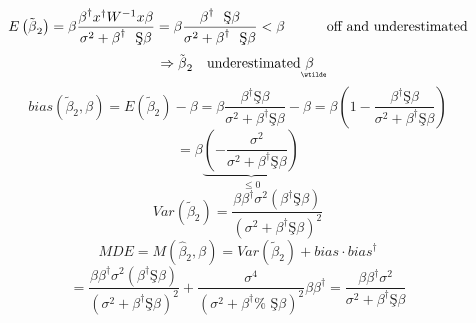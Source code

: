 \documentclass{article}
\begin{document}
\begin{equation*}
E\left( \tilde{\beta}_{2}\right) =\beta \frac{\beta ^{\dagger }x^{\dagger
}W^{-1}x\beta }{\sigma ^{2}+\beta ^{\dagger }\text{\c{S}}\beta }=\beta \frac{%
\beta ^{\dagger }\text{\c{S}}\beta }{\sigma ^{2}+\beta ^{\dagger }\text{\c{S}%
}\beta }<\beta \qquad \text{\ off and underestimated}
\end{equation*}%
\begin{equation*}
\Rightarrow \tilde{\beta}_{2}\text{ underestimated }%
\underaccent{\wtilde}{\beta}%
\end{equation*}%
\begin{equation*}
bias\left( \tilde{\beta}_{2},\beta \right) =E\left( \tilde{\beta}_{2}\right)
-\beta =\beta \frac{\beta ^{\dagger }\text{\c{S}}\beta }{\sigma ^{2}+\beta
^{\dagger }\text{\c{S}}\beta }-\beta =\beta \left( 1-\frac{\beta ^{\dagger }%
\text{\c{S}}\beta }{\sigma ^{2}+\beta ^{\dagger }\text{\c{S}}\beta }\right)
\end{equation*}%
\begin{equation*}
=\beta \underset{\leq 0}{\underbrace{\left( -\frac{\sigma ^{2}}{\sigma
^{2}+\beta ^{\dagger }\text{\c{S}}\beta }\right) }}
\end{equation*}%
\begin{equation*}
Var\left( \tilde{\beta}_{2}\right) =\frac{\beta \beta ^{\dagger }\sigma
^{2}\left( \beta ^{\dagger }\text{\c{S}}\beta \right) }{\left( \sigma
^{2}+\beta ^{\dagger }\text{\c{S}}\beta \right) ^{2}}
\end{equation*}%
\begin{equation*}
MDE=M\left( \hat{\beta}_{2},\beta \right) =Var\left( \tilde{\beta}%
_{2}\right) +bias\cdot bias^{\dagger }
\end{equation*}%
\begin{equation*}
=\frac{\beta \beta ^{\dagger }\sigma ^{2}\left( \beta ^{\dagger }\text{\c{S}}%
\beta \right) }{\left( \sigma ^{2}+\beta ^{\dagger }\text{\c{S}}\beta
\right) ^{2}}+\frac{\sigma ^{4}}{\left( \sigma ^{2}+\beta ^{\dagger }\text{%
\c{S}}\beta \right) ^{2}}\beta \beta ^{\dagger }=\frac{\beta \beta ^{\dagger
}\sigma ^{2}}{\sigma ^{2}+\beta ^{\dagger }\text{\c{S}}\beta }
\end{equation*}
\end{document}
